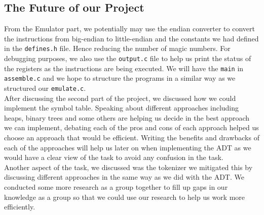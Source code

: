\documentclass[10pt]{article}
\begin{document}
\subsection{The Future of our Project}
From the Emulator part, we potentially may use the endian converter to convert the instructions from big-endian to little-endian and the constants we had defined in the {\tt{defines.h}} file. Hence reducing the number of magic numbers. For debugging purposes, we also use the {\tt{output.c}} file to help us print the status of the registers as the instructions are being executed. We will have the {\tt{main}} in {\tt{assemble.c}} and we hope to structure the programs in a similar way as we structured our {\tt{emulate.c}}.
\\After discussing the second part of the project, we discussed how we could implement the symbol table. Speaking about different approaches including heaps, binary trees and some others are helping us decide in the best approach we can implement, debating each of the pros and cons of each approach helped us choose an approach that would be efficient. Writing the benefits and drawbacks of each of the approaches will help us later on when implementing the ADT as we would have a clear view of the task to avoid any confusion in the task.
\\Another aspect of the task, we discussed was the tokenizer we mitigated this by discussing different approaches in the same way as we did with the ADT. We conducted some more research as a group together to fill up gaps in our knowledge as a group so that we could use our research to help us work more efficiently.
\end{document}
